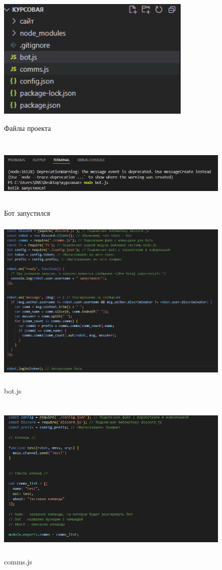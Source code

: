 \documentclass[a4paper,12pt]{article}
\begin{document}
\begin{figure}
    \centering
    \includegraphics[width = 350px]{pictures/papki.png}
    \caption{Файлы проекта}
    \label{fig:my_label5}
    \vspace{100}
    \includegraphics[width = 500px,height = 130px]{pictures/zap.png}
    \caption{Бот запустился}
    \label{fig:my_label6}
\end{figure}

\begin{figure}
    \centering
    \includegraphics[width = 450px,height = 300px]{pictures/kod.png}
    \caption{bot.js}
    \label{fig:my_label7}
    \includegraphics[width = 450px,height = 300px]{pictures/kod2.png}
    \caption{comms.js}
    \label{fig:my_label8}
\end{figure}
\end{document}
